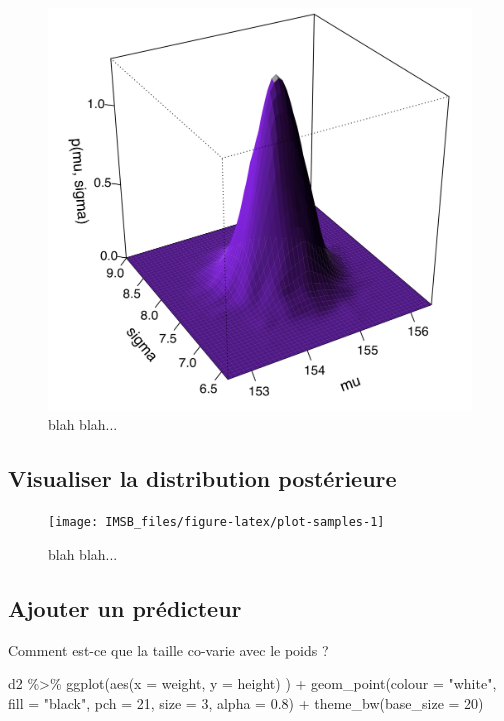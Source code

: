 \documentclass[
  a4paper,11pt,twoside,onecolumn,openright,final,oldfontcommands]{memoir}
\newenvironment{Shaded}{\begin{snugshade}}{\end{snugshade}}
\newcommand{\AttributeTok}[1]{\textcolor[rgb]{0.77,0.63,0.00}{#1}}
\newcommand{\DecValTok}[1]{\textcolor[rgb]{0.00,0.00,0.81}{#1}}
\newcommand{\FloatTok}[1]{\textcolor[rgb]{0.00,0.00,0.81}{#1}}
\newcommand{\FunctionTok}[1]{\textcolor[rgb]{0.00,0.00,0.00}{#1}}
\newcommand{\NormalTok}[1]{#1}
\newcommand{\SpecialCharTok}[1]{\textcolor[rgb]{0.00,0.00,0.00}{#1}}
\newcommand{\StringTok}[1]{\textcolor[rgb]{0.31,0.60,0.02}{#1}}
\theoremstyle{definition}
\theoremstyle{definition}
\theoremstyle{definition}
\theoremstyle{definition}
\theoremstyle{remark}
\begin{document}
\begin{figure}[!htb]

{\centering \includegraphics[width=0.75\linewidth]{figures/posterior} 

}

\caption{blah blah...}\label{fig:unnamed-chunk-31}
\end{figure}

\hypertarget{visualiser-la-distribution-postuxe9rieure-1}{%
\subsection{Visualiser la distribution postérieure}\label{visualiser-la-distribution-postuxe9rieure-1}}

\begin{figure}[!htb]

{\centering \texttt{[image: IMSB\_files/figure-latex/plot-samples-1]} 

}

\caption{blah blah...}\label{fig:plot-samples}
\end{figure}

\hypertarget{ajouter-un-pruxe9dicteur}{%
\subsection{Ajouter un prédicteur}\label{ajouter-un-pruxe9dicteur}}

Comment est-ce que la taille co-varie avec le poids ?

\begin{Shaded}
\begin{Highlighting}[]
\NormalTok{d2 }\SpecialCharTok{\%\textgreater{}\%}
  \FunctionTok{ggplot}\NormalTok{(}\FunctionTok{aes}\NormalTok{(}\AttributeTok{x =}\NormalTok{ weight, }\AttributeTok{y =}\NormalTok{ height) ) }\SpecialCharTok{+}
  \FunctionTok{geom\_point}\NormalTok{(}\AttributeTok{colour =} \StringTok{"white"}\NormalTok{, }\AttributeTok{fill =} \StringTok{"black"}\NormalTok{, }\AttributeTok{pch =} \DecValTok{21}\NormalTok{, }\AttributeTok{size =} \DecValTok{3}\NormalTok{, }\AttributeTok{alpha =} \FloatTok{0.8}\NormalTok{) }\SpecialCharTok{+}
  \FunctionTok{theme\_bw}\NormalTok{(}\AttributeTok{base\_size =} \DecValTok{20}\NormalTok{)}
\end{Highlighting}
\end{Shaded}
\end{document}
